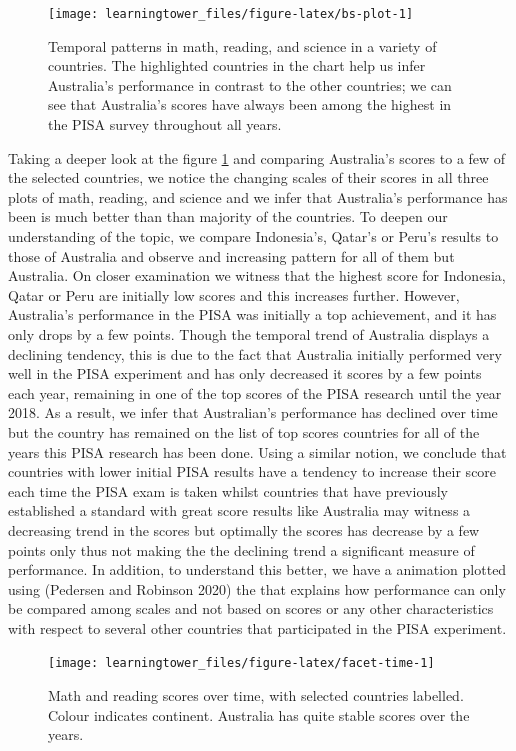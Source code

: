 \begin{figure}[H]
\texttt{[image: learningtower\_files/figure-latex/bs-plot-1]} \caption{Temporal patterns in math, reading, and science in a variety of countries. The highlighted countries in the chart help us infer Australia's performance in contrast to the other countries; we can see that Australia's scores have always been among the highest in the PISA survey throughout all years.}\label{fig:bs-plot}
\end{figure}

Taking a deeper look at the figure \ref{fig:bs-plot} and comparing Australia's scores to a few of the selected countries, we notice the changing scales of their scores in all three plots of math, reading, and science and we infer that Australia's performance has been is much better than than majority of the countries. To deepen our understanding of the topic, we compare Indonesia's, Qatar's or Peru's results to those of Australia and observe and increasing pattern for all of them but Australia. On closer examination we witness that the highest score for Indonesia, Qatar or Peru are initially low scores and this increases further. However, Australia's performance in the PISA was initially a top achievement, and it has only drops by a few points. Though the temporal trend of Australia displays a declining tendency, this is due to the fact that Australia initially performed very well in the PISA experiment and has only decreased it scores by a few points each year, remaining in one of the top scores of the PISA research until the year 2018. As a result, we infer that Australian's performance has declined over time but the country has remained on the list of top scores countries for all of the years this PISA research has been done. Using a similar notion, we conclude that countries with lower initial PISA results have a tendency to increase their score each time the PISA exam is taken whilst countries that have previously established a standard with great score results like Australia may witness a decreasing trend in the scores but optimally the scores has decrease by a few points only thus not making the the declining trend a significant measure of performance. In addition, to understand this better, we have a animation plotted using  (Pedersen and Robinson 2020) the that explains how performance can only be compared among scales and not based on scores or any other characteristics with respect to several other countries that participated in the PISA experiment.

\begin{figure}
\texttt{[image: learningtower\_files/figure-latex/facet-time-1]} \caption{Math and reading scores over time, with selected countries labelled. Colour indicates continent. Australia has quite stable scores over the years.}\label{fig:facet-time}
\end{figure}

